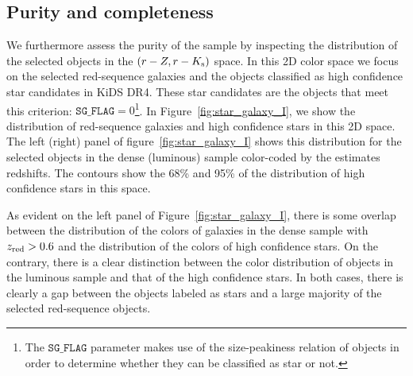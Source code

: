 \documentclass[fleqn,usenatbib,useAMS]{mnras}
\begin{document}
\subsection{Purity and completeness}\label{sec:purity}

We furthermore assess the purity of the sample by inspecting the distribution of the selected objects in the $(r-Z, r-K_{\rm s})$ space. 
In this 2D color space we focus on the selected red-sequence galaxies and the objects classified as high confidence star candidates in KiDS DR4. These star candidates are the objects that meet this criterion: $\mathtt{SG\_FLAG}= 0$\footnote{The $\mathtt{SG\_FLAG}$ parameter makes use of the size-peakiness relation of objects in order to determine whether they can be classified as star or not.}.
In Figure~\ref{fig:star_galaxy_I}, we show the distribution of red-sequence galaxies and high confidence stars in this 2D space. 
The left (right) panel of figure~\ref{fig:star_galaxy_I} shows this distribution for the selected objects in the dense (luminous) sample color-coded by the estimates redshifts. The contours show the 68\% and 95\% of the distribution of high confidence stars in this space. 

As evident on the left panel of Figure~\ref{fig:star_galaxy_I}, there is some overlap between the distribution of the colors of galaxies in the dense sample with $z_{\rm red}>0.6$ and the distribution of the colors of high confidence stars. On the contrary, there is a clear distinction between the color distribution of objects in the luminous sample and that of the high confidence stars. In both cases, there is clearly a gap between the objects labeled as stars and a large majority of the selected red-sequence objects.
\end{document}
